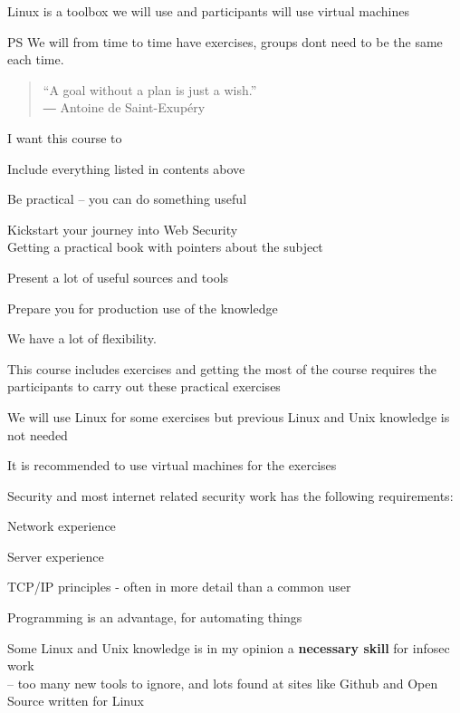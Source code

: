 \documentclass[Screen16to9,17pt]{foils}
\begin{document}
Linux is a toolbox we will use and participants will use virtual machines

\vskip 1cm
PS We will from time to time have exercises, groups dont need to be the same each time.



\begin{quote}
  “A goal without a plan is just a wish.”\\
  ― Antoine de Saint-Exupéry
\end{quote}

I want this course to
\begin{list2}
\item Include everything listed in contents above
\item Be practical -- you can do something useful
\item Kickstart your journey into Web Security\\
Getting a practical book with pointers about the subject
\item Present a lot of useful sources and tools
\item Prepare you for production use of the knowledge
\end{list2}

We have a lot of flexibility.



\begin{list1}
\item This course includes exercises and getting the most of the course requires the participants to carry out these practical exercises
\item We will use Linux for some exercises but previous Linux and Unix knowledge is not needed
\item It is recommended to use virtual machines for the exercises
\item Security and most internet related security work has the following requirements:
\begin{list2}
\item Network experience
\item Server experience
\item TCP/IP principles - often in more detail than a common user
\item Programming is an advantage, for automating things
\item Some Linux and Unix knowledge is in my opinion a {\bf necessary skill} for infosec work\\
-- too many new tools to ignore, and lots found at sites like Github and Open Source written for Linux
\end{list2}
\end{list1}
\end{document}

